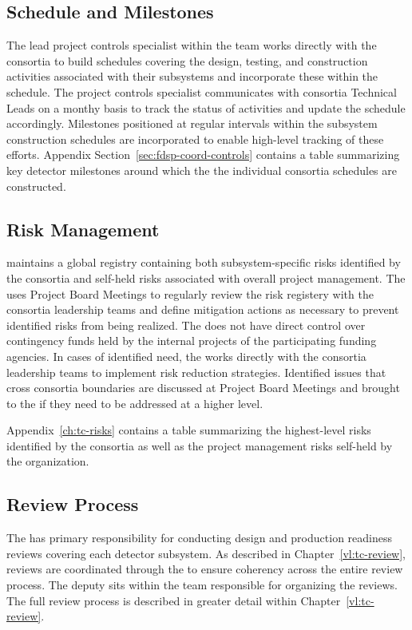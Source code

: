  
\subsection{Schedule and Milestones}

The lead project controls specialist within the  team works
directly with the  consortia to build schedules covering
the design, testing, and construction activities associated with their
subsystems and incorporate these within the  schedule.
The project controls specialist communicates with consortia Technical
Leads on a monthy basis to track the status of activities and update
the  schedule accordingly.  Milestones positioned at regular
intervals within the subsystem construction schedules are incorporated
to enable high-level tracking of these efforts.  Appendix Section~\ref{sec:fdsp-coord-controls}
contains a table summarizing key detector milestones around which the
the individual consortia schedules are constructed.

\subsection{Risk Management}

  maintains a global registry containing both
subsystem-specific risks identified by the consortia and self-held
risks associated with overall  project management.  The
 uses Project Board Meetings to regularly review the
risk registery with the consortia leadership teams and define
mitigation actions as necessary to prevent identified risks from being
realized.  The  does not have direct control over
contingency funds held by the internal projects of the participating
funding agencies.  In cases of identified need, the 
works directly with the consortia leadership teams to implement risk
reduction strategies.  Identified issues that cross consortia
boundaries are discussed at Project Board Meetings and brought to the
  if they need to be addressed at a higher
level.

Appendix~\ref{ch:tc-risks} contains a table summarizing the highest-level
risks identified by the consortia as well as the project management
risks self-held by the  organization.


\subsection{Review Process}

The  has primary responsibility for conducting design
and production readiness reviews covering each detector subsystem.
As described in Chapter~\ref{vl:tc-review}, reviews are coordinated
through the  to ensure coherency across the entire review
process.  The deputy  sits within the  team
responsible for organizing the reviews.  The full review process is
described in greater detail within Chapter~\ref{vl:tc-review}.
